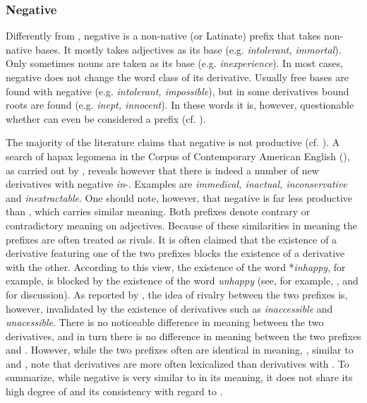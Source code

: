 \subsubsection{Negative  } \label{negative in}

Differently from , negative  is a non-native (or Latinate) prefix that takes non-native bases. It mostly takes adjectives as its base (e.g. \textit{intolerant, immortal}). Only sometimes nouns are taken as its base (e.g. \textit{inexperience}).  In most cases, negative  does not change the word class of its derivative.  Usually free bases are found with negative  (e.g. \textit{intolerant, impossible}), but in some derivatives bound roots are found (e.g. \textit{inept, innocent}). In these words it is, however, questionable whether  can even be considered a prefix (cf. \citealt[356 f, 611]{Bauer.2013}).

The majority of the literature claims that negative  is not productive (cf. \citealt[1688]{Bauer.2002}). A search of hapax legomena in the Corpus of Contemporary American English (\citealt{Davies.20082014}), as carried out by \citet[361] {Bauer.2013}, reveals however that there is indeed a number of new derivatives with negative \textit{in}-. Examples are \textit{immedical, inactual, inconservative} and \textit{inextractable}.  One should note, however, that negative  is far less productive than , which carries similar meaning. Both prefixes denote contrary or contradictory meaning on adjectives.
 Because of these similarities in meaning the prefixes are often treated as rivals. It is often claimed that the existence of a derivative featuring one of the two prefixes blocks the existence of  a derivative with the other. According to this view, the existence of the word *\textit{inhappy}, for example, is blocked by the existence of the word \textit{unhappy} (see, for example,  \citealt[467 ff]{Jespersen.1965}, \citealt[1688 f]{Bauer.2002} and \citealt[377 ff]{Bauer.2013} for discussion).  
As reported by \citet[377]{Bauer.2013}, the idea of rivalry between the two prefixes is, however, invalidated by the existence of derivatives such as \textit{inaccessible} and \textit{unacessible}. There is no noticeable difference in meaning between the two derivatives, and in turn there is no difference in meaning between the two prefixes  and .
However, while the two prefixes often are identical in meaning, \citet[379]{Bauer.2013}, similar to  \cite{Jespersen.1965} and \cite{Bauer.2002},  note that derivatives are more often lexicalized than derivatives with . To summarize, while negative  is very similar to  in its meaning, it does not share its high degree of  and its consistency with regard to .

